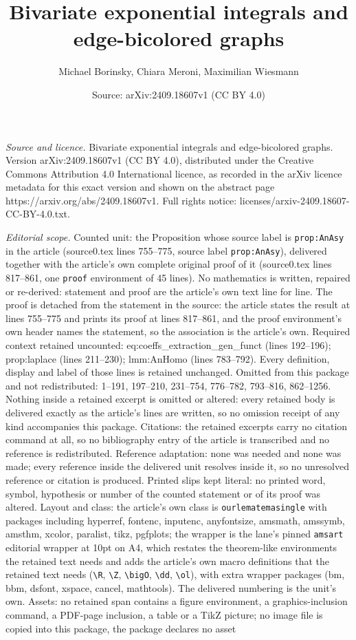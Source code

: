 \documentclass[10pt,a4paper]{amsart}
\title[Bivariate exponential integrals and edge-bicolored graphs]{Bivariate exponential integrals and edge-bicolored graphs}
\author{Michael Borinsky, Chiara Meroni, Maximilian Wiesmann}
\date{Source: arXiv:2409.18607v1 (CC BY 4.0)}
\begin{document}
\maketitle

\noindent\emph{Source and licence.} Bivariate exponential integrals and edge-bicolored graphs. Version arXiv:2409.18607v1 (CC BY 4.0), distributed under the Creative Commons Attribution 4.0 International licence, as recorded in the arXiv licence metadata for this exact version and shown on the abstract page https://arxiv.org/abs/2409.18607v1. Full rights notice: licenses/arxiv-2409.18607-CC-BY-4.0.txt.\par\smallskip

\noindent\textit{Editorial scope.} Counted unit: the Proposition whose source label is \texttt{prop:AnAsy} in the article (source0.tex lines 755--775, source label \texttt{prop:AnAsy}), delivered together with the article's own complete original proof of it (source0.tex lines 817--861, one \texttt{proof} environment of 45 lines). No mathematics is written, repaired or re-derived: statement and proof are the article's own text line for line. The proof is detached from the statement in the source: the article states the result at lines 755--775 and prints its proof at lines 817--861, and the proof environment's own header names the statement, so the association is the article's own. Required context retained uncounted: eq:coeffs\_extraction\_gen\_funct (lines 192--196); prop:laplace (lines 211--230); lmm:AnHomo (lines 783--792). Every definition, display and label of those lines is retained unchanged. Omitted from this package and not redistributed: 1--191, 197--210, 231--754, 776--782, 793--816, 862--1256. Nothing inside a retained excerpt is omitted or altered: every retained body is delivered exactly as the article's lines are written, so no omission receipt of any kind accompanies this package. Citations: the retained excerpts carry no citation command at all, so no bibliography entry of the article is transcribed and no reference is redistributed. Reference adaptation: none was needed and none was made; every reference inside the delivered unit resolves inside it, so no unresolved reference or citation is produced. Printed slips kept literal: no printed word, symbol, hypothesis or number of the counted statement or of its proof was altered. Layout and class: the article's own class is \texttt{ourlematemasingle} with packages including hyperref, fontenc, inputenc, anyfontsize, amsmath, amssymb, amsthm, xcolor, paralist, tikz, pgfplots; the wrapper is the lane's pinned \texttt{amsart} editorial wrapper at 10pt on A4, which restates the theorem-like environments the retained text needs and adds the article's own macro definitions that the retained text needs (\texttt{\textbackslash R}, \texttt{\textbackslash Z}, \texttt{\textbackslash bigO}, \texttt{\textbackslash dd}, \texttt{\textbackslash ol}), with extra wrapper packages (bm, bbm, dsfont, xspace, cancel, mathtools). The delivered numbering is the unit's own. Assets: no retained span contains a figure environment, a graphics-inclusion command, a PDF-page inclusion, a table or a TikZ picture; no image file is copied into this package, the package declares no asset 
\end{document}
